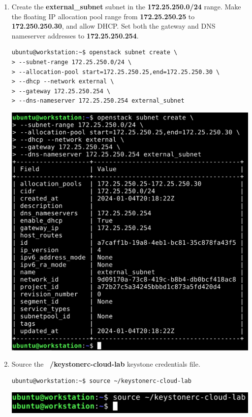 \documentclass[letterpaper, 12pt]{article}
\begin{document}
\begin{enumerate}
    \item Create the \textbf{external\_subnet} subnet in the \textbf{172.25.250.0/24} range. Make the floating IP
    allocation pool range from \textbf{172.25.250.25} to \textbf{172.250.250.30}, and allow DHCP. Set both the gateway
    and DNS nameserver addresses to \textbf{172.25.250.254}.
\begin{lstlisting}
ubuntu@workstation:~$ openstack subnet create \
> --subnet-range 172.25.250.0/24 \
> --allocation-pool start=172.25.250.25,end=172.25.250.30 \
> --dhcp --network external \
> --gateway 172.25.250.254 \
> --dns-nameserver 172.25.250.254 external_subnet
\end{lstlisting}

    \begin{center}
        \includegraphics[width=\linewidth]{images/part1/step19.png}
    \end{center}

    \item Source the \textbf{~/keystonerc-cloud-lab} keystone credentials file.
\begin{lstlisting}
ubuntu@workstation:~$ source ~/keystonerc-cloud-lab
\end{lstlisting}

    \begin{center}
        \includegraphics[width=\linewidth]{images/part1/step20.png}
    \end{center}


\end{enumerate}
\end{document}
